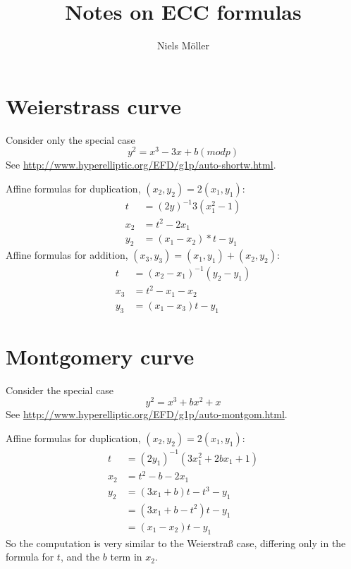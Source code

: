 \documentclass[a4paper]{article}
\author{Niels Möller}
\title{Notes on ECC formulas}
\begin{document}
\maketitle

\section{Weierstrass curve}

Consider only the special case
\begin{equation*}
  y^2 = x^3 - 3x + b (mod p)     
\end{equation*}
See \url{http://www.hyperelliptic.org/EFD/g1p/auto-shortw.html}.

Affine formulas for duplication, $(x_2, y_2) = 2(x_1, y_1)$:
\begin{align*}
  t &=  (2y)^{-1} 3 (x_1^2 - 1) \\
  x_2 &= t^2 - 2 x_1 \\
  y_2 &= (x_1 - x_2) * t - y_1
\end{align*}
Affine formulas for addition, $(x_3, y_3) = (x_1, y_1) + (x_2,
y_2)$:
\begin{align}
  t &= (x_2 - x_1)^{-1} (y_2 - y_1) \\
  x_3 &= t^2 - x_1 - x_2 \\
  y_3 &= (x_1 - x_3) t - y_1
\end{align}

\section{Montgomery curve}

Consider the special case
\begin{equation*}
  y^2 = x^3 + b x^2 + x  
\end{equation*}
See \url{http://www.hyperelliptic.org/EFD/g1p/auto-montgom.html}.

Affine formulas for duplication, $(x_2, y_2) = 2(x_1, y_1)$:
\begin{align*}
  t &= (2 y_1)^{-1} (3 x_1^2 + 2b x_1 + 1) \\
  x_2 &= t^2 - b - 2 x_1 \\
  y_2 &= (3 x_1 + b) t - t^3 - y_1 \\
  &= (3 x_1 + b - t^2) t - y_1 \\
  &= (x_1 - x_2) t - y_1
\end{align*}
So the computation is very similar to the Weierstraß case, differing
only in the formula for $t$, and the $b$ term in $x_2$.
\end{document}
